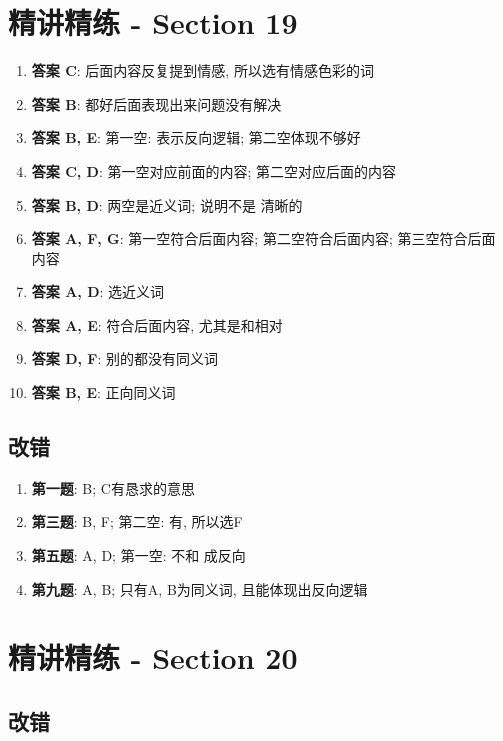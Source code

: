 \section{精讲精练 - Section 19}

  \begin{enumerate}
    \item \textbf{答案 C}: 后面内容反复提到情感, 所以选有情感色彩的词
    \item \textbf{答案 B}: 都好后面表现出来问题没有解决
    \item \textbf{答案 B, E}: 第一空: 表示反向逻辑; 第二空体现不够好
    \item \textbf{答案 C, D}: 第一空对应前面的内容; 第二空对应后面的内容
    \item \textbf{答案 B, D}: 两空是近义词; 说明不是
    清晰的
    \item \textbf{答案 A, F, G}: 第一空符合后面内容; 第二空符合后面内容; 第三空符合后面
    内容
    \item \textbf{答案 A, D}: 选近义词
    \item \textbf{答案 A, E}: 符合后面内容, 尤其是和相对
    \item \textbf{答案 D, F}: 别的都没有同义词
    \item \textbf{答案 B, E}: 正向同义词
  \end{enumerate}

  \subsection{改错}

    \begin{enumerate}
      \item \textbf{第一题}: B; C有恳求的意思
      \item \textbf{第三题}: B, F; 第二空: 有, 所以选F
      \item \textbf{第五题}: A, D; 第一空: 不和
      成反向
      \item \textbf{第九题}: A, B; 只有A, B为同义词, 且能体现出反向逻辑
    \end{enumerate}

\section{精讲精练 - Section 20}

  \subsection{改错}

